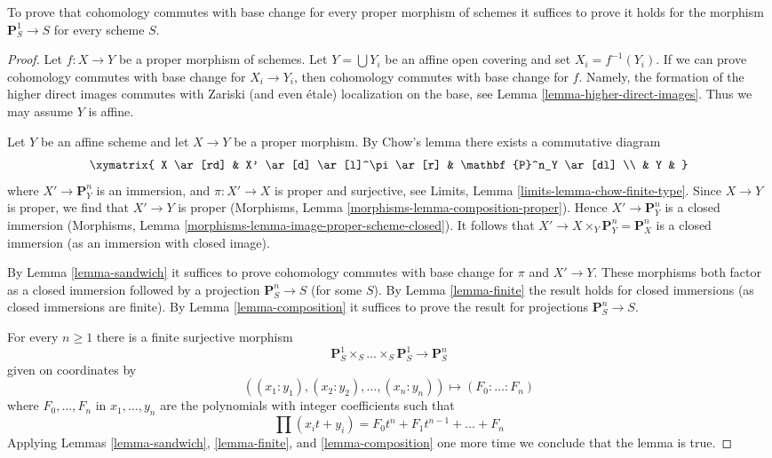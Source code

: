 \begin{lemma}
\label{lemma-reduce-to-P1}
To prove that cohomology commutes with base change for
every proper morphism of schemes it suffices to prove it
holds for the morphism $\mathbf{P}^1_S \to S$ for every scheme $S$.
\end{lemma}

\begin{proof}
Let $f : X \to Y$ be a proper morphism of schemes.
Let $Y = \bigcup Y_i$ be an affine open covering
and set $X_i = f^{-1}(Y_i)$. If we can prove
cohomology commutes with base change for $X_i \to Y_i$,
then cohomology commutes with base change for $f$.
Namely, the formation of the higher direct images
commutes with Zariski (and even \'etale) localization
on the base, see
Lemma \ref{lemma-higher-direct-images}.
Thus we may assume $Y$ is affine.

\medskip\noindent
Let $Y$ be an affine scheme and let $X \to Y$ be a proper morphism.
By Chow's lemma there exists a commutative diagram
$$
\xymatrix{
X \ar[rd] & X' \ar[d] \ar[l]^\pi \ar[r] & \mathbf{P}^n_Y \ar[dl] \\
& Y &
}
$$
where $X' \to \mathbf{P}^n_Y$ is an immersion, and
$\pi : X' \to X$ is proper and surjective, see
Limits, Lemma \ref{limits-lemma-chow-finite-type}.
Since $X \to Y$ is proper, we find that $X' \to Y$ is proper
(Morphisms, Lemma \ref{morphisms-lemma-composition-proper}).
Hence $X' \to \mathbf{P}^n_Y$ is a closed immersion
(Morphisms, Lemma \ref{morphisms-lemma-image-proper-scheme-closed}).
It follows that $X' \to X \times_Y \mathbf{P}^n_Y = \mathbf{P}^n_X$
is a closed immersion (as an immersion with closed image).

\medskip\noindent
By Lemma \ref{lemma-sandwich}
it suffices to prove cohomology commutes with base change for
$\pi$ and $X' \to Y$. These morphisms both factor as a closed
immersion followed by a projection $\mathbf{P}^n_S \to S$ (for some $S$).
By Lemma \ref{lemma-finite} the result holds for closed
immersions (as closed immersions are finite).
By Lemma \ref{lemma-composition} it suffices to prove the
result for projections $\mathbf{P}^n_S \to S$.

\medskip\noindent
For every $n \geq 1$ there is a finite surjective morphism
$$
\mathbf{P}^1_S \times_S \ldots \times_S \mathbf{P}^1_S
\longrightarrow
\mathbf{P}^n_S
$$
given on coordinates by
$$
((x_1 : y_1), (x_2 : y_2), \ldots, (x_n : y_n))
\longmapsto
(F_0 : \ldots : F_n)
$$
where $F_0, \ldots, F_n$ in $x_1, \ldots, y_n$
are the polynomials with integer coefficients such that
$$
\prod (x_i t + y_i) = F_0 t^n + F_1 t^{n - 1} + \ldots + F_n
$$
Applying
Lemmas \ref{lemma-sandwich}, \ref{lemma-finite}, and \ref{lemma-composition}
one more time we conclude that the lemma is true.
\end{proof}
